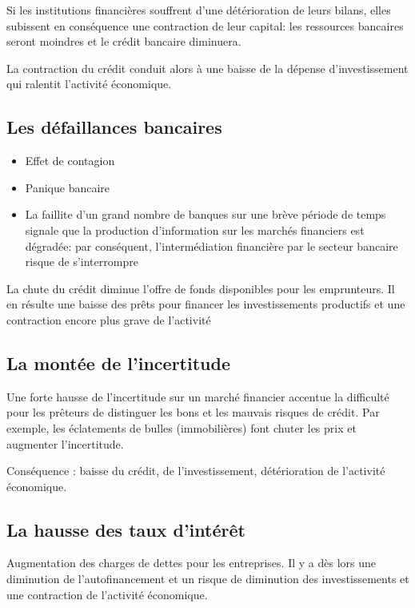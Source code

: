 	Si les institutions financières souffrent d'une détérioration de leurs bilans, elles subissent en conséquence une contraction de leur capital: les ressources bancaires seront moindres et le crédit bancaire diminuera.
	
	La contraction du crédit conduit alors à une baisse de la dépense d'investissement qui ralentit l'activité économique.
	
	\subsection{Les défaillances bancaires}

	\begin{itemize}
		\item Effet de contagion 
		\item Panique bancaire 
		\item La faillite d'un grand nombre de banques sur une brève période de temps signale que la production d'information sur les marchés financiers est dégradée: par conséquent, l'intermédiation financière par le secteur bancaire risque de s'interrompre 
	\end{itemize}
	
	La chute du crédit diminue l'offre de fonds disponibles pour les 
emprunteurs. Il en résulte une baisse des prêts pour financer les investissements productifs et une contraction encore plus grave de l'activité 

	\subsection{La montée de l'incertitude}
	
	Une forte hausse de l'incertitude sur un marché financier accentue la difficulté pour les prêteurs de distinguer les bons et les mauvais risques de crédit. Par exemple, les éclatements de bulles (immobilières) font chuter les prix et augmenter l'incertitude.
	
	Conséquence : baisse du crédit, de l'investissement, détérioration de l'activité économique.
	
	\subsection{La hausse des taux d'intérêt}
	
Augmentation des charges de dettes pour les entreprises. Il y a dès lors une diminution de l'autofinancement et un risque de diminution des investissements et une contraction de l'activité économique.


